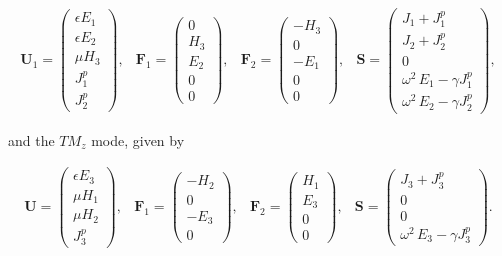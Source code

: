 \begin{equation*}
\begin{array}{ccccc}
\mathbf{U}_1 = \begin{pmatrix} \epsilon E_1 \\ \epsilon E_2 \\ \mu H_3 \\ J^p_1 \\  J^p_2 \end{pmatrix} ,
&
\mathbf{F}_1 = \begin{pmatrix} 0 \\ H_3 \\ E_2 \\ 0 \\  0 \end{pmatrix} ,
&
\mathbf{F}_2 = \begin{pmatrix} - H_3 \\ 0 \\ -E_1 \\ 0 \\ 0 \end{pmatrix} ,
&
\mathbf{S} = \begin{pmatrix} J_1 + J^p_1 \\ J_2+ J^p_2 \\ 0 \\ \omega^2 \, E_1 - \gamma J^p_1 \\  \omega^2 \, E_2 - \gamma J^p_2 \end{pmatrix} ,
\end{array}
\:
\end{equation*}

and the $TM_z$ mode, given by

\begin{equation*}
\begin{array}{ccccc}
\mathbf{U} = \begin{pmatrix} \epsilon E_3 \\ \mu H_1 \\ \mu H_2 \\ J^p_3 \end{pmatrix} ,
&
\mathbf{F}_1 = \begin{pmatrix} -H_2 \\ 0 \\ -E_3 \\ 0 \end{pmatrix} ,
&
\mathbf{F}_2 = \begin{pmatrix} H_1 \\ E_3 \\ 0 \\ 0 \end{pmatrix} ,
&
\mathbf{S} = \begin{pmatrix} J_3 + J^p_3 \\ 0 \\ 0 \\ \omega^2 \, E_3 - \gamma J^p_3 \end{pmatrix} .
\end{array}
\:
\end{equation*}

